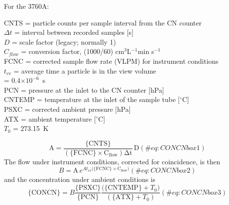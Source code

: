 \documentclass[
  english,
]{book}
\begin{document}
For the 3760A:

CNTS = particle counts per sample interval from the CN
counter\\
\(\Delta t\) = interval
between recorded samples {[}s{]}\\
\(D\) = scale factor (legacy; normally 1)\\
\(C_{flow}\) =
conversion
factor, (1000/60) cm\(^{3}\)L\(^{-1}\)min s\(^{-1}\)\\
FCNC = corrected sample flow rate (VLPM) for instrument
conditions\\
\(t_{vv}\) = average time a particle is in the view volume\\
\hspace*{0.333em}\hspace*{0.333em}\hspace*{0.333em}\hspace*{0.333em}\hspace*{0.333em}\hspace*{0.333em}\hspace*{0.333em}=
0.4\(\times10^{-6}\)~s\\
PCN = pressure at the inlet to the CN counter {[}hPa{]}\\
CNTEMP = temperature at the inlet of the sample tube
{[}\(^{\circ}\)C{]}\\
PSXC = corrected ambient pressure {[}hPa{]}\\
ATX = ambient temperature {[}\(^{\circ}\)C{]}\\
\(T_{0}\) = 273.15~K

\begin{equation}
\mathrm{A=\frac{\{CNTS\}}{\mathrm{(\{FCNC\}\times C_{flow})}\Delta t}\,D}
(\#eq:CONCNbox1)
\end{equation} The flow under instrument conditions, corrected for
coincidence, is then\\
\begin{equation}
B\mathrm{=A}\,e^{At_{vv}(\mathrm{\{FCNC\}\times C_{flow})}}
(\#eq:CONCNbox2)
\end{equation} and the concentration under ambient conditions
is\\
\begin{equation}
\mathrm{\{CONCN\}}=B\frac{\mathrm{\{PSXC\}}}{\mathrm{\{PCN\}}}\frac{\mathrm{(\{CNTEMP\}}+T_{0})}{(\mathrm{\{ATX\}}+T_{0})}
(\#eq:CONCNbox3)
\end{equation}
\end{document}
